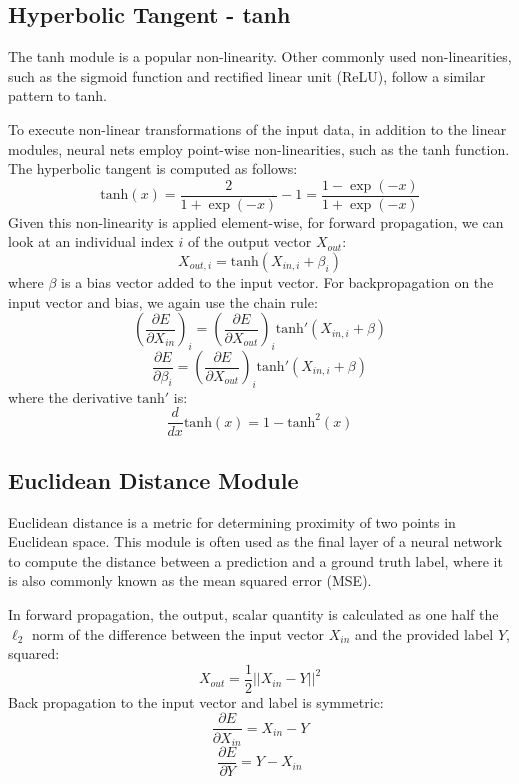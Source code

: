 \subsection{Hyperbolic Tangent - tanh}

The tanh module is a popular non-linearity. Other commonly used non-linearities, such as the sigmoid function and rectified linear unit (ReLU), follow a similar pattern to tanh.

To execute non-linear transformations of the input data, in addition to the linear modules, neural nets employ point-wise non-linearities, such as the tanh function.
The hyperbolic tangent is computed as follows: $$\mathrm{tanh}(x) = \frac{2}{1 + \exp(-x)} - 1 = \frac{1 - \exp(-x)}{1 + \exp(-x)}$$ Given this non-linearity is applied element-wise, for forward propagation, we can look at an individual index $i$ of the output vector $X_{out}$: $$X_{out, i} = \mathrm{tanh}(X_{in, i} + \beta_i)$$ where $\beta$ is a bias vector added to the input vector.
For backpropagation on the input vector and bias, we again use the chain rule: $$\left(\frac{\partial E}{\partial X_{in}}\right)_{i} = \left(\frac{\partial E}{\partial X_{out}}\right)_{i}\mathrm{tanh}'(X_{in, i} + \beta)$$ $$\frac{\partial E}{\partial \beta_i} = \left(\frac{\partial E}{\partial X_{out}}\right)_{i}\mathrm{tanh}'(X_{in, i} + \beta)$$ where the derivative $\mathrm{tanh}'$ is: $$\frac{d}{dx}\mathrm{tanh}(x) = 1 - \mathrm{tanh}^2(x)$$

\subsection{Euclidean Distance Module}

Euclidean distance is a metric for determining proximity of two points in Euclidean space.
This module is often used as the final layer of a neural network to compute the distance between a prediction and a ground truth label, where it is also commonly known as the mean squared error (MSE).

In forward propagation, the output, scalar quantity is calculated as one half the $\ell_2$ norm of the difference between the input vector $X_{in}$ and the provided label $Y$, squared: $$X_{out} = \frac{1}{2}||X_{in} - Y||^2$$ Back propagation to the input vector and label is symmetric: $$\frac{\partial E}{\partial X_{in}} = X_{in} - Y$$ $$\frac{\partial E}{\partial Y} = Y - X_{in}$$

